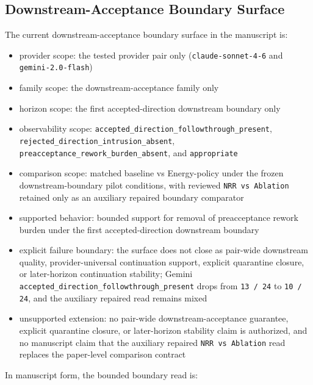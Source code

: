 \documentclass[11pt]{article}
\begin{document}
\subsection{Downstream-Acceptance Boundary Surface}

The current downstream-acceptance boundary surface in the manuscript is:

\begin{itemize}
\item provider scope:
  the tested provider pair only (\texttt{claude-sonnet-4-6} and
  \texttt{gemini-2.0-flash})
\item family scope:
  the downstream-acceptance family only
\item horizon scope:
  the first accepted-direction downstream boundary only
\item observability scope:
  \texttt{accepted\_direction\_followthrough\_present},
  \texttt{rejected\_direction\_intrusion\_absent},
  \texttt{preacceptance\_rework\_burden\_absent}, and \texttt{appropriate}
\item comparison scope:
  matched baseline vs Energy-policy under the frozen downstream-boundary pilot
  conditions, with reviewed \texttt{NRR vs Ablation} retained only as an
  auxiliary repaired boundary comparator
\item supported behavior:
  bounded support for removal of preacceptance rework burden under the first
  accepted-direction downstream boundary
\item explicit failure boundary:
  the surface does not close as pair-wide downstream quality, provider-universal
  continuation support, explicit quarantine closure, or later-horizon
  continuation stability; Gemini
  \texttt{accepted\_direction\_followthrough\_present} drops from
  \texttt{13 / 24} to \texttt{10 / 24}, and the auxiliary repaired read
  remains mixed
\item unsupported extension:
  no pair-wide downstream-acceptance guarantee, explicit quarantine closure, or
  later-horizon stability claim is authorized, and no manuscript claim that the
  auxiliary repaired \texttt{NRR vs Ablation} read replaces the paper-level
  comparison contract
\end{itemize}

In manuscript form, the bounded boundary read is:
\end{document}
